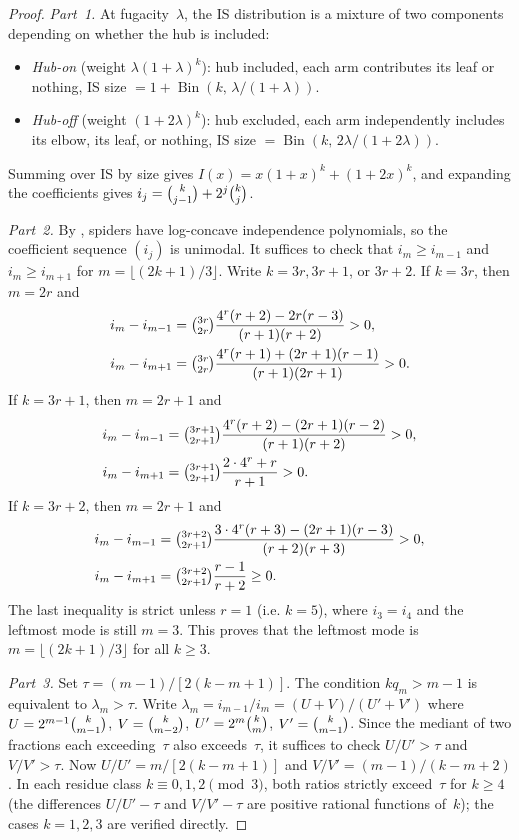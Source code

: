 \documentclass[12pt,oneside]{article}
\theoremstyle{remark}
\begin{document}
\begin{proof}
\textit{Part~1.}
At fugacity~$\lambda$, the IS distribution is a mixture of two components depending on whether the hub is included:
\begin{itemize}
  \item \emph{Hub-on} (weight $\lambda(1+\lambda)^k$): hub included, each arm contributes its leaf or nothing, IS size $= 1 + \operatorname{Bin}(k,\, \lambda/(1+\lambda))$.
  \item \emph{Hub-off} (weight $(1+2\lambda)^k$): hub excluded, each arm independently includes its elbow, its leaf, or nothing, IS size $= \operatorname{Bin}(k,\, 2\lambda/(1+2\lambda))$.
\end{itemize}
Summing over IS by size gives $I(x) = x(1+x)^k + (1+2x)^k$, and expanding the coefficients gives $i_j = \tbinom{k}{j-1} + 2^j\tbinom{k}{j}$.

\textit{Part~2.}
By \textcite{li2025spiders}, spiders have log-concave independence polynomials, so the coefficient sequence $(i_j)$ is unimodal.
It suffices to check that $i_m \ge i_{m-1}$ and $i_m \ge i_{m+1}$ for $m = \lfloor(2k+1)/3\rfloor$.
Write $k = 3r, 3r+1$, or $3r+2$.
If $k = 3r$, then $m = 2r$ and
\[
  \begin{aligned}
  i_m - i_{m-1}
  &= \tbinom{3r}{2r}\frac{4^r(r+2) - 2r(r-3)}{(r+1)(r+2)} > 0,\\
  i_m - i_{m+1}
  &= \tbinom{3r}{2r}\frac{4^r(r+1) + (2r+1)(r-1)}{(r+1)(2r+1)} > 0.
  \end{aligned}
\]
If $k = 3r+1$, then $m = 2r+1$ and
\[
  \begin{aligned}
  i_m - i_{m-1}
  &= \tbinom{3r+1}{2r+1}\frac{4^r(r+2) - (2r+1)(r-2)}{(r+1)(r+2)} > 0,\\
  i_m - i_{m+1}
  &= \tbinom{3r+1}{2r+1}\frac{2\cdot 4^r + r}{r+1} > 0.
  \end{aligned}
\]
If $k = 3r+2$, then $m = 2r+1$ and
\[
  \begin{aligned}
  i_m - i_{m-1}
  &= \tbinom{3r+2}{2r+1}\frac{3\cdot 4^r(r+3) - (2r+1)(r-3)}{(r+2)(r+3)} > 0,\\
  i_m - i_{m+1}
  &= \tbinom{3r+2}{2r+1}\frac{r-1}{r+2} \ge 0.
  \end{aligned}
\]
The last inequality is strict unless $r = 1$ (i.e. $k = 5$), where $i_3 = i_4$ and the leftmost mode is still $m = 3$.
This proves that the leftmost mode is $m = \lfloor(2k+1)/3\rfloor$ for all $k \ge 3$.

\textit{Part~3.}
Set $\tau = (m-1)/[2(k-m+1)]$.
The condition $kq_m > m-1$ is equivalent to $\lambda_m > \tau$.
Write $\lambda_m = i_{m-1}/i_m = (U + V)/(U' + V')$ where $U = 2^{m-1}\tbinom{k}{m-1}$, $V = \tbinom{k}{m-2}$, $U' = 2^m\tbinom{k}{m}$, $V' = \tbinom{k}{m-1}$.
Since the mediant of two fractions each exceeding~$\tau$ also exceeds~$\tau$, it suffices to check $U/U' > \tau$ and $V/V' > \tau$.
Now $U/U' = m/[2(k{-}m{+}1)]$ and $V/V' = (m{-}1)/(k{-}m{+}2)$.
In each residue class $k \equiv 0, 1, 2 \pmod{3}$, both ratios strictly exceed~$\tau$ for $k \ge 4$ (the differences $U/U' - \tau$ and $V/V' - \tau$ are positive rational functions of~$k$); the cases $k = 1, 2, 3$ are verified directly.


\end{proof}
\end{document}
